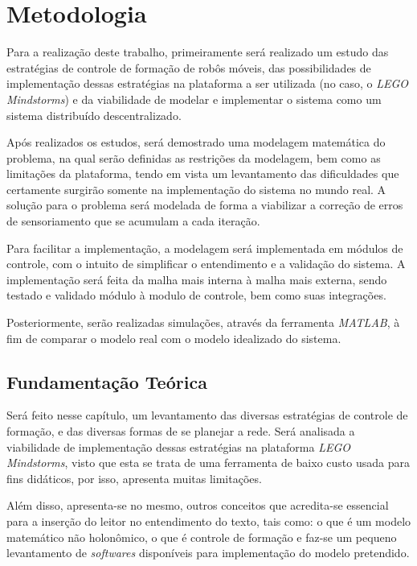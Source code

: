 %
%

\chapter{Metodologia}

Para a realização deste trabalho, primeiramente será realizado um estudo das estratégias de controle de formação de robôs móveis, das possibilidades %
de implementação dessas estratégias na plataforma a ser utilizada (no caso, o \emph{LEGO Mindstorms}) e da viabilidade de modelar e implementar o sistema como um sistema distribuído descentralizado. 

Após realizados os estudos, será demostrado uma modelagem matemática do problema, na qual serão definidas as restrições da modelagem, bem como as limitações da plataforma, tendo em vista um levantamento das dificuldades que certamente surgirão somente na implementação do sistema no mundo real. A solução para o problema será modelada de forma a viabilizar a correção de erros de sensoriamento que se acumulam a cada iteração.

Para facilitar a implementação, a modelagem será implementada em módulos de controle, com o intuito de simplificar o entendimento e a validação do sistema. A implementação será feita da malha mais interna à malha mais externa, sendo testado e validado módulo à modulo de controle, bem como suas integrações. 

Posteriormente, serão realizadas simulações, através da ferramenta \emph{MATLAB}, à fim de comparar o modelo real com o modelo idealizado do sistema.

\section{Fundamentação Teórica}

Será feito nesse capítulo, um levantamento das diversas estratégias de controle de formação, e das diversas formas de se planejar a rede. Será analisada a viabilidade de implementação dessas estratégias na plataforma \emph{LEGO Mindstorms}, visto que esta se trata de uma ferramenta de baixo custo usada para fins didáticos, por isso, apresenta muitas limitações.

Além disso, apresenta-se no mesmo, outros conceitos que acredita-se essencial para a inserção do leitor no entendimento do texto, tais como: o que é um modelo matemático não holonômico, o que é controle de formação e faz-se um pequeno levantamento de \emph{softwares} disponíveis para implementação do modelo pretendido. 

